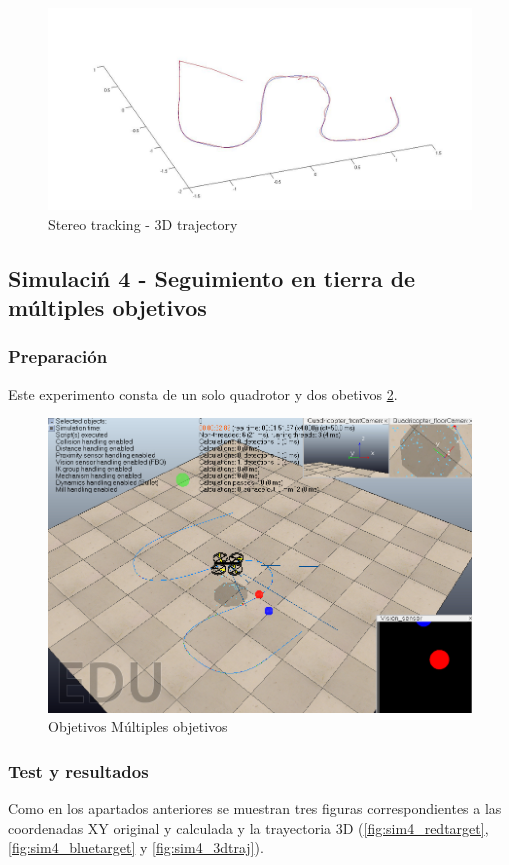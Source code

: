 \begin{figure}[htp]
		\centering
		\includegraphics[width=0.4\linewidth]{../Images/c3/sim3_traj_both_3d}
		\caption{Stereo tracking - 3D trajectory}
		\label{fig:sim3_traj_both_3d}
\end{figure}

\subsection{Simulaci\'n 4 - Seguimiento en tierra de m\'ultiples objetivos}
\subsubsection{Preparaci\'on}
 Este experimento consta de un solo quadrotor y dos obetivos \ref{fig:sim4_set_up}.
 
\begin{figure}[htp]
	\centering
	\includegraphics[width=0.4\linewidth]{../Images/c3/sim4_set_up}
	\caption{Objetivos M\'ultiples objetivos}
	\label{fig:sim4_set_up}
\end{figure}

\subsubsection{Test y resultados}

	Como en los apartados anteriores se muestran tres figuras correspondientes a las coordenadas XY original y calculada y la trayectoria 3D (\ref{fig:sim4_redtarget}, \ref{fig:sim4_bluetarget} y \ref{fig:sim4_3dtraj}). \\
	
